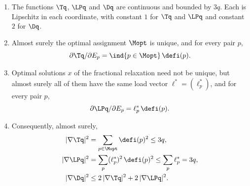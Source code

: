 \begin{lemma}\label{lem:variance-gradient}
\begin{enumerate}
\item[\textup{(1)}] The functions $\Tq$, $\LPq$ and $\Dq$ are continuous and bounded by
$3q$. Each is Lipschitz in each coordinate, with constant $1$ for $\Tq$ and $\LPq$ and
constant $2$ for $\Dq$.
\item[\textup{(2)}] Almost surely the optimal assignment $\Mopt$ is unique, and for every
pair $p$,
\[
\partial\Tq/\partial E_p=\ind\{p\in\Mopt\}\,\defi(p).
\]
\item[\textup{(3)}] Optimal solutions $x$ of the fractional relaxation need not be unique,
but almost surely all of them have the same load vector $\ell^*=(\ell^*_p)$, and for every
pair $p$,
\[
\partial\LPq/\partial E_p=\ell^*_p\,\defi(p).
\]
\item[\textup{(4)}] Consequently, almost surely,
\begin{align*}
|\nabla\Tq|^2&=\sum_{p\in\Mopt}\defi(p)^2\le3q,\\
|\nabla\LPq|^2&=\sum_p(\ell^*_p)^2\,\defi(p)^2\le\sum_p\ell^*_p=3q,\\
|\nabla\Dq|^2&\le2\,|\nabla\Tq|^2+2\,|\nabla\LPq|^2 .
\end{align*}
\end{enumerate}
\end{lemma}

